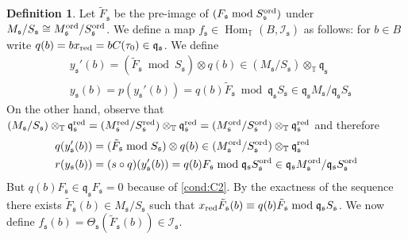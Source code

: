 \documentclass[leqno]{amsart}
\theoremstyle{definition}
\newtheorem{defn}[thm]{Definition}
\theoremstyle{remark}
\DeclareMathOperator{\Hom}{Hom}
\newcommand{\fq}{\mathfrak{q}}
\newcommand{\fs}{\mathfrak{s}}
\newcommand{\red}{\textnormal{red}}
\newcommand{\xx}{x_\textnormal{red}}
\newcommand{\TT}{\mathbb{T}} %
\newcommand{\I}{\mathcal{I}} %
\newcommand{\ord}{\textnormal{ord}} %
\begin{document}
\begin{defn}\label{def:cong_map}
Let $\tilde{F}_\fs$ be the pre-image of
$(F_\fs\bmod S_\fs^{\ord})$ under 
$M_\fs/S_\fs\cong M^{\ord}_{\fs}/S^{\ord}_{\fs}$.
We define a map  $f_\fs\in \Hom_{\TT}(B,\I_\fs)$ 
as follows:
for $b\in B$ write $q(b)=b\xx=bC(\tau_0)\in\fq_\fs$.
We define
\begin{align*}
   &y_\fs'(b)=
(\tilde{F}_\fs\bmod S_\fs)\otimes q(b)\in 
(M_\fs/S_\fs)\otimes_\TT\fq_\fs\\
   &y_\fs(b)=p(y_\fs'(b))=
q(b)\tilde{F}_\fs\bmod \fq_\fs S_\fs\in 
\fq_\fs M_\fs/\fq_\fs S_\fs
\end{align*}
On the other hand, observe that 
$(M_\fs/S_\fs)\otimes_{\TT}\fq_\fs^\red=
(M_\fs^{\red}/S_\fs^{\red})\otimes_{\TT}\fq_\fs^\red=
(M_\fs^{\ord}/S_\fs^{\ord})\otimes_{\TT}\fq_\fs^\red$
and therefore
\begin{align*}
   q(y_\fs'(b))&=
(\tilde{F}_\fs\bmod S_\fs)\otimes q(b)\in 
(M^{\ord}_\fs/S^{\ord}_\fs)\otimes_\TT\fq_\fs^\red\\
   r(y_\fs(b))&=(s\circ q)(y_\fs'(b))=
q(b)F_\fs\bmod \fq_\fs S^{\ord}_\fs\in 
\fq_\fs M^{\ord}_\fs/\fq_\fs S^{\ord}_\fs
\end{align*}
But $q(b){F}_\fs\in \fq_\fs {F}_\fs=0$ 
because of \ref{cond:C2}.
By the exactness of the sequence
there exists $\tilde{F}_\fs(b)\in M_\fs/ S_\fs$
such that 
$\xx \tilde{F}_\fs(b)\equiv q(b)\tilde{F}_\fs
\bmod \fq_\fs S_\fs$.
We now define 
$f_\fs(b)=\Theta_\fs(\tilde{F}_\fs(b))\in \I_\fs$.


\end{defn}
\end{document}
